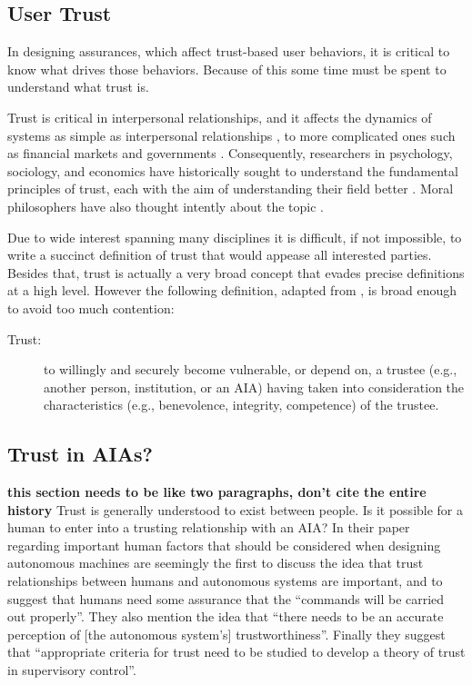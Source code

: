 \subsection{User Trust}
    In designing assurances, which affect trust-based user behaviors, it is critical to know what drives those behaviors. Because of this some time must be spent to understand what trust is. 

    Trust is critical in interpersonal relationships, and it affects the dynamics of systems as simple as interpersonal relationships \cite{Lewicki2006-hj}, to more complicated ones such as financial markets and governments \cite{Fukuyama1995-un}. Consequently, researchers in psychology, sociology, and economics have historically sought to understand the fundamental principles of trust, each with the aim of understanding their field better \cite{Gambetta1988-pi}. Moral philosophers have also thought intently about the topic \cite{Baier1986-im}.

    Due to wide interest spanning many disciplines it is difficult, if not impossible, to write a succinct definition of trust that would appease all interested parties. Besides that, trust is actually a very broad concept that evades precise definitions at a high level. However the following definition, adapted from \cite{McKnight2004-vv}, is broad enough to avoid too much contention:

    \begin{description}
        \item [Trust:] to willingly and securely become vulnerable, or depend on, a trustee (e.g., another person, institution, or an AIA) having taken into consideration the characteristics (e.g., benevolence,  integrity,  competence)  of  the  trustee.
    \end{description}

    \subsection{Trust in AIAs?}
    \textbf{this section needs to be like two paragraphs, don't cite the entire history}
        Trust is generally understood to exist between people. Is it possible for a human to enter into a trusting relationship with an AIA? In their paper regarding important human factors that should be considered when designing autonomous machines \cite{Sheridan1984-kx} are seemingly the first to discuss the idea that trust relationships between humans and autonomous systems are important, and to suggest that humans need some assurance that the ``commands will be carried out properly''. They also mention the idea that ``there needs to be an accurate perception of [the autonomous system's] trustworthiness''. Finally they suggest that ``appropriate criteria for trust need to be studied to develop a theory of trust in supervisory control''.

